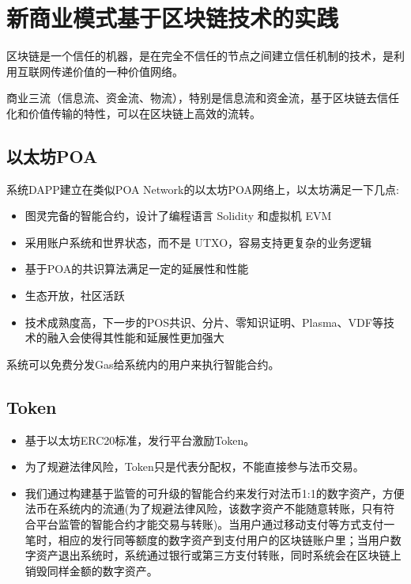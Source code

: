 \documentclass[UTF9]{ctexart}
\begin{document}
\section{新商业模式基于区块链技术的实践}

区块链是一个信任的机器，是在完全不信任的节点之间建立信任机制的技术，是利用互联网传递价值的一种价值网络。

商业三流（信息流、资金流、物流），特别是信息流和资金流，基于区块链去信任化和价值传输的特性，可以在区块链上高效的流转。

\subsection{以太坊POA}

系统DAPP建立在类似POA Network的以太坊POA网络上，以太坊满足一下几点:
\begin{itemize}
\item 图灵完备的智能合约，设计了编程语言 Solidity 和虚拟机 EVM
\item 采用账户系统和世界状态，而不是 UTXO，容易支持更复杂的业务逻辑
\item 基于POA的共识算法满足一定的延展性和性能
\item 生态开放，社区活跃
\item 技术成熟度高，下一步的POS共识、分片、零知识证明、Plasma、VDF等技术的融入会使得其性能和延展性更加强大
\end{itemize}

系统可以免费分发Gas给系统内的用户来执行智能合约。

\subsection{Token}

\begin{itemize}

\item 基于以太坊ERC20标准，发行平台激励Token。

\item 为了规避法律风险，Token只是代表分配权，不能直接参与法币交易。

\item 我们通过构建基于监管的可升级的智能合约来发行对法币1:1的数字资产，方便法币在系统内的流通(为了规避法律风险，该数字资产不能随意转账，只有符合平台监管的智能合约才能交易与转账)。当用户通过移动支付等方式支付一笔时，相应的发行同等额度的数字资产到支付用户的区块链账户里；当用户数字资产退出系统时，系统通过银行或第三方支付转账，同时系统会在区块链上销毁同样金额的数字资产。

\end{itemize}
\end{document}
